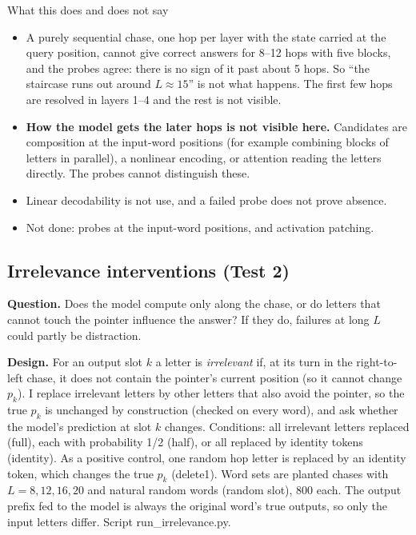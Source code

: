 \documentclass[paper=a4,fontsize=11pt,DIV=11,parskip=half,headings=small,numbers=noendperiod]{scrartcl}
\DeclareRobustCommand{\lead}[1]{\textsf{\bfseries\color{accent}#1}}
\DeclareRobustCommand{\code}[1]{{\fontseries{m}\ttfamily #1}}
\begin{document}
\begin{findbox}{What this does and does not say}
\begin{itemize}
\item A purely sequential chase, one hop per layer with the state carried at the query position, cannot give
  correct answers for 8–12 hops with five blocks, and the probes agree: there is no sign of it past about 5
  hops. So “the staircase runs out around $L\approx15$” is not what happens. The first few hops are resolved in
  layers 1–4 and the rest is not visible.
\item \lead{How the model gets the later hops is not visible here.} Candidates are composition at the input-word
  positions (for example combining blocks of letters in parallel), a nonlinear encoding, or attention reading
  the letters directly. The probes cannot distinguish these.
\item Linear decodability is not use, and a failed probe does not prove absence.
\item Not done: probes at the input-word positions, and activation patching.
\end{itemize}
\end{findbox}

\subsection{Irrelevance interventions (Test 2)}\label{sec:3.7}
\lead{Question.} Does the model compute only along the chase, or do letters that cannot touch the pointer
influence the answer? If they do, failures at long $L$ could partly be distraction.

\lead{Design.} For an output slot $k$ a letter is \emph{irrelevant} if, at its turn in the right-to-left chase,
it does not contain the pointer’s current position (so it cannot change $p_k$). I replace irrelevant letters by
other letters that also avoid the pointer, so the true $p_k$ is unchanged by construction (checked on every
word), and ask whether the model’s prediction at slot $k$ changes. Conditions: all irrelevant letters replaced
(\code{full}), each with probability 1/2 (\code{half}), or all replaced by identity tokens (\code{identity}). As
a positive control, one random hop letter is replaced by an identity token, which changes the true $p_k$
(\code{delete1}). Word sets are planted chases with $L=8,12,16,20$ and natural random words (random slot), 800
each. The output prefix fed to the model is always the original word’s true outputs, so only the input letters
differ. Script \code{run\_\allowbreak{}irrelevance.\allowbreak{}py}.
\end{document}
